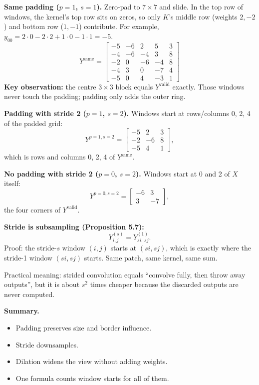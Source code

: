 \textbf{Same padding ($p=1$, $s=1$).} Zero-pad to $7\times7$ and slide. In the top row of windows, the kernel's top row sits on zeros, so only $K$'s middle row (weights $2,-2$) and bottom row ($1,-1$) contribute. For example, $y_{00}=2\cdot0-2\cdot2+1\cdot0-1\cdot1=-5$.
\[
Y^{\text{same}}=\begin{bmatrix}
-5&-6&2&5&3\\
-4&-6&-4&3&8\\
-2&0&-6&-4&8\\
-4&3&0&-7&4\\
-5&0&4&-3&1
\end{bmatrix}
\]
\textbf{Key observation:} the centre $3\times3$ block equals $Y^{\text{valid}}$ exactly. Those windows never touch the padding; padding only adds the outer ring.

\textbf{Padding with stride 2 ($p=1$, $s=2$).} Windows start at rows/columns 0, 2, 4 of the padded grid:
\[
Y^{p=1,s=2}=\begin{bmatrix}-5&2&3\\-2&-6&8\\-5&4&1\end{bmatrix},
\]
which is rows and columns 0, 2, 4 of $Y^{\text{same}}$.

\textbf{No padding with stride 2 ($p=0$, $s=2$).} Windows start at 0 and 2 of $X$ itself:
\[
Y^{p=0,s=2}=\begin{bmatrix}-6&3\\3&-7\end{bmatrix},
\]
the four corners of $Y^{\text{valid}}$.

\textbf{Stride is subsampling (Proposition 5.7):}
\[
Y^{(s)}_{i,j}=Y^{(1)}_{si,\,sj}.
\]
Proof: the stride-$s$ window $(i,j)$ starts at $(si,sj)$, which is exactly where the stride-1 window $(si,sj)$ starts. Same patch, same kernel, same sum.

Practical meaning: strided convolution equals ``convolve fully, then throw away outputs'', but it is about $s^2$ times cheaper because the discarded outputs are never computed.

\textbf{Summary.}
\begin{itemize}
  \item Padding preserves size and border influence.
  \item Stride downsamples.
  \item Dilation widens the view without adding weights.
  \item One formula counts window starts for all of them.
\end{itemize}

